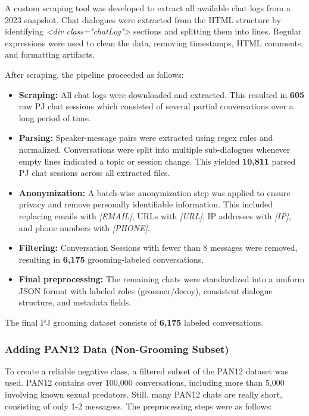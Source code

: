A custom scraping tool was developed to extract all available chat logs from a 2023 snapshot. Chat dialogues were extracted from the HTML structure by identifying \textit{<div class="chatLog">} sections and splitting them into lines. Regular expressions were used to clean the data, removing timestamps, HTML comments, and formatting artifacts. 

After scraping, the pipeline proceeded as follows:
\begin{itemize}
    \item \textbf{Scraping:} All chat logs were downloaded and extracted. This resulted in \textbf{605} raw PJ chat sessions which consisted of several partial conversations over a long period of time.
    \item \textbf{Parsing:} Speaker-message pairs were extracted using regex rules and normalized. Conversations were split into multiple sub-dialogues whenever empty lines indicated a topic or session change. This yielded \textbf{10,811} parsed PJ chat sessions across all extracted files.
    \item \textbf{Anonymization:} A batch-wise anonymization step was applied to ensure privacy and remove personally identifiable information. This included replacing emails with \textit{[EMAIL]}, URLs with \textit{[URL]}, IP addresses with \textit{[IP]}, and phone numbers with \textit{[PHONE]}.
    \item \textbf{Filtering:} Conversation Sessions with fewer than 8 messages were removed, resulting in \textbf{6,175} grooming-labeled conversations.
    \item \textbf{Final preprocessing:} The remaining chats were standardized into a uniform JSON format with labeled roles (groomer/decoy), consistent dialogue structure, and metadata fields.
\end{itemize}

The final PJ grooming dataset consists of \textbf{6,175} labeled conversations.

\subsubsection{Adding PAN12 Data (Non-Grooming Subset)}
To create a reliable negative class, a filtered subset of the PAN12 dataset was used. PAN12 contains over 100{,}000 conversations, including more than 5{,}000 involving known sexual predators. Still, many PAN12 chats are really short, consisting of only 1-2 messagess. The preprocessing steps were as follows:

